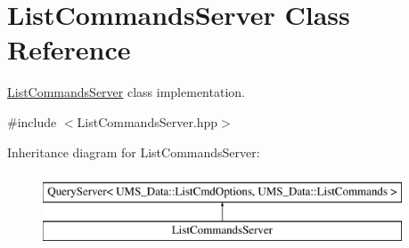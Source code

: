 \hypertarget{classListCommandsServer}{
\section{ListCommandsServer Class Reference}
\label{classListCommandsServer}
}


\hyperlink{classListCommandsServer}{ListCommandsServer} class implementation.  




{\ttfamily \#include $<$ListCommandsServer.hpp$>$}

Inheritance diagram for ListCommandsServer:\begin{figure}[H]
\begin{center}
\leavevmode
\includegraphics[height=2.000000cm]{classListCommandsServer}
\end{center}
\end{figure}
